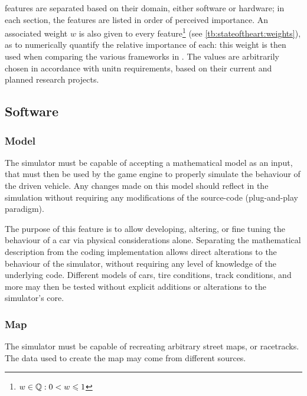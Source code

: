 \Glspl{feature} are separated based on their domain, either software or hardware; in each section, the \glspl{feature} are listed in order of perceived importance. An associated weight $w$ is also given to every \gls{feature}\footnote{$w \in \mathbb{Q}: 0 < w \leqslant 1$} (see \cref{tb:stateoftheart:weights}), as to numerically quantify the relative importance of each: this weight is then used when comparing the various \glspl{framework} in . The values are arbitrarily chosen in accordance with \gls{unitn} requirements, based on their current and planned research projects.



\subsection{Software}

\subsubsection{Model}

The simulator must be capable of accepting a mathematical model as an input, that must then be used by the game engine to properly simulate the behaviour of the driven vehicle. Any changes made on this model should reflect in the simulation without requiring any modifications of the source-code (plug-and-play paradigm).

The purpose of this \gls{feature} is to allow developing, altering, or fine tuning the behaviour of a car via physical considerations alone. Separating the mathematical description from the coding implementation allows direct alterations to the behaviour of the simulator, without requiring any level of knowledge of the underlying code. Different models of cars, tire conditions, track conditions, and more may then be tested without explicit additions or alterations to the simulator's core.

\subsubsection{Map}

The simulator must be capable of recreating arbitrary street maps, or racetracks. The data used to create the map may come from different sources.

